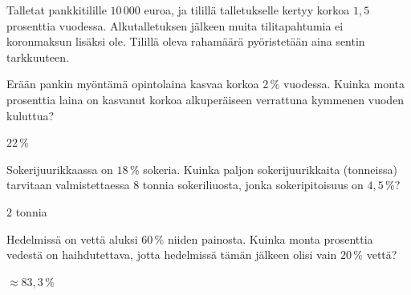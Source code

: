 \begin{tehtavasivu}
\begin{tehtava}
Talletat pankkitilille $10\,000$ euroa, ja tilillä talletukselle kertyy korkoa $1,5$ prosenttia vuodessa. Alkutalletuksen jälkeen muita tilitapahtumia ei koronmaksun lisäksi ole. Tilillä oleva rahamäärä pyöristetään aina sentin tarkkuuteen.
	\begin{vastaus}
	\end{vastaus}
\end{tehtava}

\begin{tehtava}
    Erään pankin myöntämä opintolaina kasvaa korkoa $2\,\%$ vuodessa. Kuinka monta prosenttia laina on kasvanut korkoa alkuperäiseen verrattuna kymmenen vuoden kuluttua?
    \begin{vastaus}
        $22\,\%$
    \end{vastaus}
\end{tehtava}

\begin{tehtava}
    Sokerijuurikkaassa on $18\,\%$ sokeria. Kuinka paljon sokerijuurikkaita (tonneissa) tarvitaan valmistettaessa $8$ tonnia sokeriliuosta, jonka sokeripitoisuus on $4,5\,\%$?
    \begin{vastaus}
        $2$ tonnia
    \end{vastaus}
\end{tehtava}

\begin{tehtava} %
    Hedelmissä on vettä aluksi $60\,\%$ niiden painosta. Kuinka monta prosenttia vedestä on haihdutettava, jotta hedelmissä tämän jälkeen olisi vain $20\,\%$ vettä?
    \begin{vastaus}
        $\approx83,3\,\%$ %
    \end{vastaus}
\end{tehtava}


\end{tehtavasivu}
